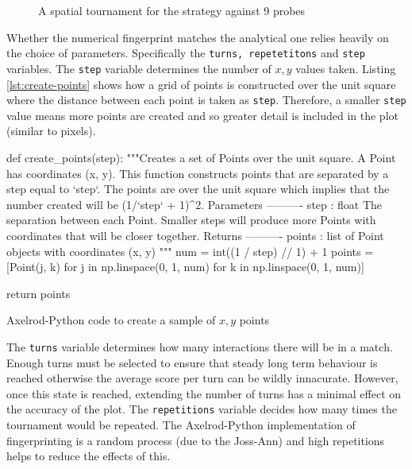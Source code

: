 \begin{figure}[!hbtp]
    \begin{center}
        
        \caption{A spatial tournament for the strategy against 9 probes}\label{fig:spatialtourn}
    \end{center}
\end{figure}


Whether the numerical fingerprint matches the analytical one relies heavily on the choice of parameters.
Specifically the \texttt{turns, repetetitons} and \texttt{step} variables.
The \texttt{step} variable determines the number of $x,y$ values taken.
Listing \ref{lst:create-points} shows how a grid of points is constructed over the unit square where the distance between each point is taken as \texttt{step}.
Therefore, a smaller \texttt{step} value means more points are created and so greater detail is included in the plot (similar to pixels).

\begin{listing}[hbtp!]
\begin{SourceCode}
def create_points(step):
    """Creates a set of Points over the unit square.
    A Point has coordinates (x, y). This function constructs points that are
    separated by a step equal to `step`. The points are over the unit
    square which implies that the number created will be (1/`step` + 1)^2.
    Parameters
    ----------
    step : float
        The separation between each Point. Smaller steps will produce more
        Points with coordinates that will be closer together.
    Returns
    ----------
    points : list
        of Point objects with coordinates (x, y)
    """
    num = int((1 / step) // 1) + 1
    points = [Point(j, k) for j in np.linspace(0, 1, num)
              for k in np.linspace(0, 1, num)]

    return points
\end{SourceCode}
\caption{Axelrod-Python code to create a sample of $x,y$ points}
\label{lst:create-points}
\end{listing}

The \texttt{turns} variable determines how many interactions there will be in a match.
Enough turns must be selected to ensure that steady long term behaviour is reached otherwise the average score per turn can be wildly innacurate.
However, once this state is reached, extending the number of turns has a minimal effect on the accuracy of the plot.
The \texttt{repetitions} variable decides how many times the tournament would be repeated.
The Axelrod-Python implementation of fingerprinting is a random process (due to the Joss-Ann) and high repetitions helps to reduce the effects of this.


